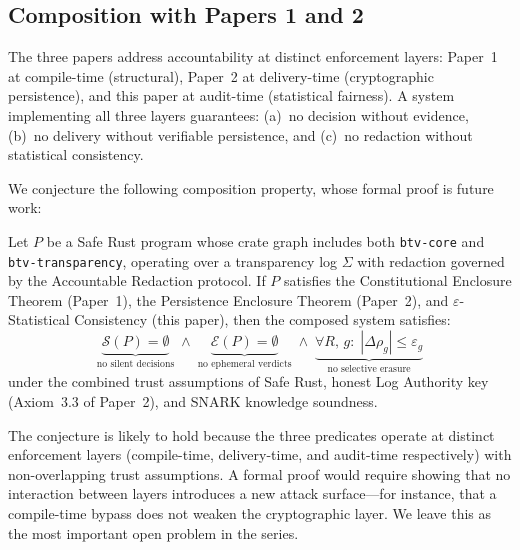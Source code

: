 \subsection{Composition with Papers 1 and 2}
\label{sec:composition}

The three papers address accountability at distinct enforcement layers:
Paper~1 at compile-time (structural), Paper~2 at delivery-time
(cryptographic persistence), and this paper at audit-time (statistical
fairness). A system implementing all three layers guarantees: (a)~no decision
without evidence, (b)~no delivery without verifiable persistence, and
(c)~no redaction without statistical consistency.

We conjecture the following composition property, whose formal proof
is future work:

\begin{conjecture}
\label{conj:composition}
Let $P$ be a Safe Rust program whose crate graph includes both
\texttt{btv-core} and \texttt{btv-transparency}, operating over a
transparency log $\Sigma$ with redaction governed by the Accountable
Redaction protocol. If $P$ satisfies the Constitutional Enclosure
Theorem (Paper~1), the Persistence Enclosure Theorem (Paper~2), and
$\varepsilon$-Statistical Consistency (this paper), then the
composed system satisfies:
\[
\underbrace{\mathcal{S}(P) = \emptyset}_{\text{no silent decisions}}
\;\land\;
\underbrace{\mathcal{E}(P) = \emptyset}_{\text{no ephemeral verdicts}}
\;\land\;
\underbrace{\forall R,\, g:\; |\Delta\rho_g| \leq \varepsilon_g}_{\text{no selective erasure}}
\]
under the combined trust assumptions of Safe Rust, honest Log Authority
key (Axiom~3.3 of Paper~2), and SNARK knowledge soundness.
\end{conjecture}

\noindent The conjecture is likely to hold because the three predicates
operate at distinct enforcement layers (compile-time, delivery-time,
and audit-time respectively) with non-overlapping trust assumptions.
A formal proof would require showing that no interaction between
layers introduces a new attack surface---for instance, that a
compile-time bypass does not weaken the cryptographic layer.
We leave this as the most important open problem in the series.
